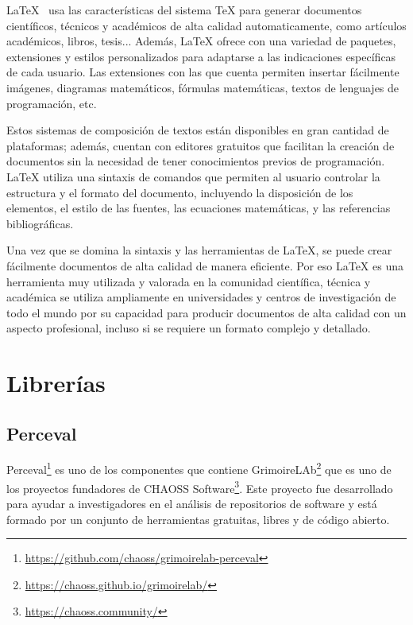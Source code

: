 \documentclass[a4paper, 12pt]{book}
\begin{document}
LaTeX~\cite{rodriguez2014edicion} usa las características del sistema TeX para generar documentos científicos, técnicos y académicos de alta calidad automaticamente, como artículos académicos, libros, tesis...   
Además, LaTeX ofrece con una variedad de paquetes, extensiones y estilos personalizados para adaptarse a las indicaciones específicas de cada usuario.
Las extensiones con las que cuenta permiten insertar fácilmente imágenes, diagramas matemáticos, fórmulas matemáticas, textos de lenguajes de programación, etc.


Estos sistemas de composición de textos están disponibles en gran cantidad de plataformas; además, cuentan con editores gratuitos que facilitan la creación de documentos sin la necesidad de tener conocimientos previos de programación.
LaTeX utiliza una sintaxis de comandos que permiten al usuario controlar la estructura y el formato del documento, incluyendo la disposición de los elementos, el estilo de las fuentes, las ecuaciones matemáticas, y las referencias bibliográficas. 


Una vez que se domina la sintaxis y las herramientas de LaTeX, se puede crear fácilmente documentos de alta calidad de manera eficiente.
Por eso LaTeX es una herramienta muy utilizada y valorada en la comunidad científica, técnica y académica se utiliza ampliamente en universidades y centros de investigación de todo el mundo por su capacidad para producir documentos de alta calidad con un aspecto profesional, incluso si se requiere un formato complejo y detallado. 


\section{Librerías} %
\label{sec:librerías}

\subsection{Perceval} %
\label{sec:perceval} %


Perceval\footnote{\url{https://github.com/chaoss/grimoirelab-perceval}} es uno de los componentes que contiene GrimoireLAb\footnote{\url{https://chaoss.github.io/grimoirelab/}} que es uno de los proyectos fundadores de CHAOSS Software\footnote{\url{https://chaoss.community/}}.
Este proyecto fue desarrollado para ayudar a investigadores en el análisis de repositorios de software y está formado por un conjunto de herramientas gratuitas, libres y de código abierto. 
\end{document}
